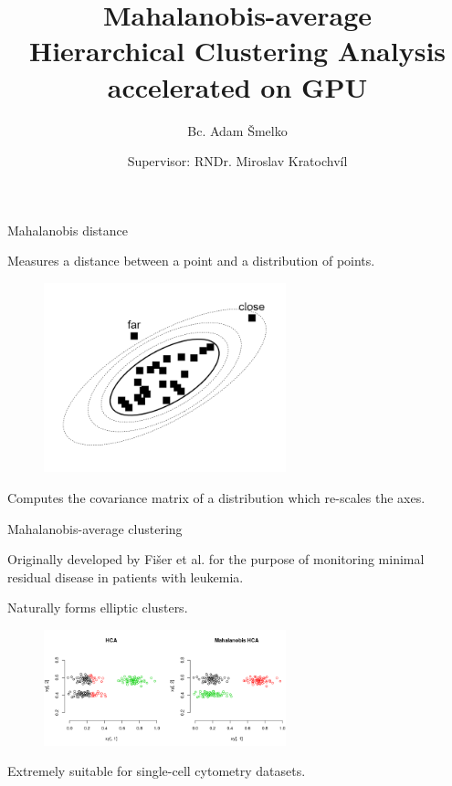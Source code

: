 \documentclass[10pt]{beamer}
\title{Mahalanobis-average \\Hierarchical Clustering Analysis \\accelerated on GPU}
\author{Bc. Adam Šmelko}
\date{Supervisor: RNDr. Miroslav Kratochvíl}
\institute{Department of Software Engineering}
\begin{document}
\maketitle


\begin{frame}{Mahalanobis distance}
	
	Measures a distance between a point and a distribution of points.
	
	\begin{figure}
		\includegraphics[width=7cm]{img/maha_dist}
	\end{figure}

	Computes the covariance matrix of a distribution which re-scales the axes.
		
\end{frame}


\begin{frame}{Mahalanobis-average clustering}
	
	Originally developed by Fišer et al. for the purpose of monitoring
	minimal residual disease in patients with leukemia.
	
	Naturally forms elliptic clusters.
	
	\begin{figure}
		\includegraphics[width=7cm]{img/mhca}
	\end{figure}
	
	Extremely suitable for single-cell cytometry datasets.
	
\end{frame}
\end{document}
